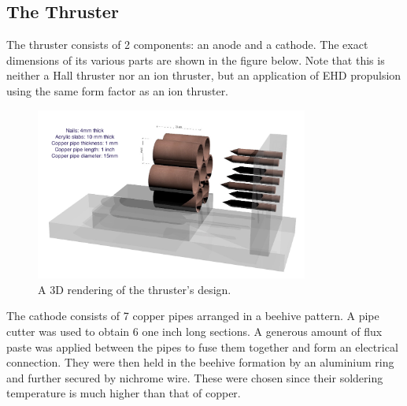\documentclass[11pt]{article}
\begin{document}
\subsection{The Thruster}

The thruster consists of 2 components: an anode and a cathode. The exact dimensions of its various parts are shown in the figure below. Note that this is neither a Hall thruster nor an ion thruster, but an application of EHD propulsion using the same form factor as an ion thruster.\\

\begin{figure}[h!]
\centering
\includegraphics[width = 0.8\textwidth]{thruster_schematic}
\caption{\label{fig:thruster_schematic} A 3D rendering of the thruster's design.}
\end{figure}

The cathode consists of 7 copper pipes arranged in a beehive pattern. A pipe cutter was used to obtain 6 one inch long sections. A generous amount of flux paste was applied between the pipes to fuse them together and form an electrical connection. They were then held in the beehive formation by an aluminium ring and further secured by nichrome wire. These were chosen since their soldering temperature is much higher than that of copper.\\
\end{document}
